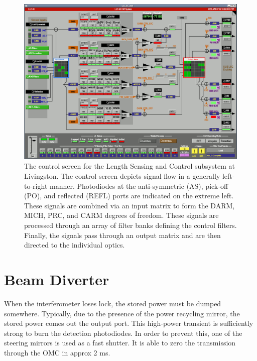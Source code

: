 \begin{figure}
\includegraphics[width=\columnwidth]{figures/L1LSC.png}
\caption[Length Sensing and Control (LSC) control screen]{The control screen for the Length Sensing and Control
  subsystem at Livingston.  The control screen depicts signal flow in
  a generally left-to-right manner.  Photodiodes at the anti-symmetric
  (AS), pick-off (PO), and reflected (REFL) ports are indicated on the
  extreme left.  These signals are combined via an input matrix to
  form the DARM, MICH, PRC, and CARM degrees of freedom.  These
  signals are processed through an array of filter banks defining the
  control filters.  Finally, the signals pass through an output matrix
  and are then directed to the individual optics.}
\end{figure}

\section{Beam Diverter}

When the interferometer loses lock, the stored power must be dumped
somewhere. Typically, due to the presence of the power recycling mirror,
the stored power comes out the output port. This high-power transient
is sufficiently strong to burn the detection photodiodes. In order
to prevent this, one of the steering mirrors is used as a fast shutter.
It is able to zero the transmission through the OMC in approx 2 ms.

